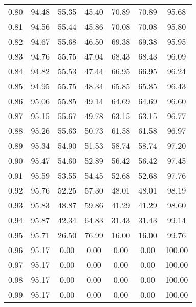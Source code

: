 \begin{tabular}{|c|c|c|c|c|c|c|}
      0.80 &     94.48 &     55.35 &      45.40 &   70.89 &      70.89 &         95.68 \\
      0.81 &     94.56 &     55.44 &      45.86 &   70.08 &      70.08 &         95.80 \\
      0.82 &     94.67 &     55.68 &      46.50 &   69.38 &      69.38 &         95.95 \\
      0.83 &     94.76 &     55.75 &      47.04 &   68.43 &      68.43 &         96.09 \\
      0.84 &     94.82 &     55.53 &      47.44 &   66.95 &      66.95 &         96.24 \\
      0.85 &     94.95 &     55.75 &      48.34 &   65.85 &      65.85 &         96.43 \\
      0.86 &     95.06 &     55.85 &      49.14 &   64.69 &      64.69 &         96.60 \\
      0.87 &     95.15 &     55.67 &      49.78 &   63.15 &      63.15 &         96.77 \\
      0.88 &     95.26 &     55.63 &      50.73 &   61.58 &      61.58 &         96.97 \\
      0.89 &     95.34 &     54.90 &      51.53 &   58.74 &      58.74 &         97.20 \\
      0.90 &     95.47 &     54.60 &      52.89 &   56.42 &      56.42 &         97.45 \\
      0.91 &     95.59 &     53.55 &      54.45 &   52.68 &      52.68 &         97.76 \\
      0.92 &     95.76 &     52.25 &      57.30 &   48.01 &      48.01 &         98.19 \\
      0.93 &     95.83 &     48.87 &      59.86 &   41.29 &      41.29 &         98.60 \\
      0.94 &     95.87 &     42.34 &      64.83 &   31.43 &      31.43 &         99.14 \\
      0.95 &     95.71 &     26.50 &      76.99 &   16.00 &      16.00 &         99.76 \\
      0.96 &     95.17 &      0.00 &       0.00 &    0.00 &       0.00 &        100.00 \\
      0.97 &     95.17 &      0.00 &       0.00 &    0.00 &       0.00 &        100.00 \\
      0.98 &     95.17 &      0.00 &       0.00 &    0.00 &       0.00 &        100.00 \\
      0.99 &     95.17 &      0.00 &       0.00 &    0.00 &       0.00 &        100.00 \\
\bottomrule
\end{tabular}
